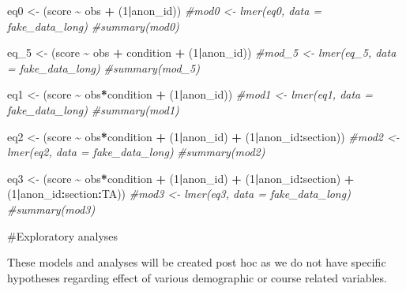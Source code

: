 \documentclass[
]{article}
\newenvironment{Shaded}{\begin{snugshade}}{\end{snugshade}}
\newcommand{\CommentTok}[1]{\textcolor[rgb]{0.56,0.35,0.01}{\textit{#1}}}
\newcommand{\DecValTok}[1]{\textcolor[rgb]{0.00,0.00,0.81}{#1}}
\newcommand{\NormalTok}[1]{#1}
\newcommand{\OtherTok}[1]{\textcolor[rgb]{0.56,0.35,0.01}{#1}}
\newcommand{\SpecialCharTok}[1]{\textcolor[rgb]{0.81,0.36,0.00}{\textbf{#1}}}
\begin{document}
\begin{Shaded}
\begin{Highlighting}[]
\NormalTok{eq0 }\OtherTok{\textless{}{-}}\NormalTok{ (score }\SpecialCharTok{\textasciitilde{}}\NormalTok{ obs }\SpecialCharTok{+}\NormalTok{ (}\DecValTok{1}\SpecialCharTok{|}\NormalTok{anon\_id))}
\CommentTok{\#mod0 \textless{}{-} lmer(eq0, data = fake\_data\_long)}
\CommentTok{\#summary(mod0)}



\NormalTok{eq\_5 }\OtherTok{\textless{}{-}}\NormalTok{ (score }\SpecialCharTok{\textasciitilde{}}\NormalTok{ obs }\SpecialCharTok{+}\NormalTok{ condition }\SpecialCharTok{+}\NormalTok{ (}\DecValTok{1}\SpecialCharTok{|}\NormalTok{anon\_id))}
\CommentTok{\#mod\_5 \textless{}{-} lmer(eq\_5, data = fake\_data\_long)}
\CommentTok{\#summary(mod\_5)}


\NormalTok{eq1 }\OtherTok{\textless{}{-}}\NormalTok{ (score }\SpecialCharTok{\textasciitilde{}}\NormalTok{ obs}\SpecialCharTok{*}\NormalTok{condition }\SpecialCharTok{+}\NormalTok{ (}\DecValTok{1}\SpecialCharTok{|}\NormalTok{anon\_id))}
\CommentTok{\#mod1 \textless{}{-} lmer(eq1, data = fake\_data\_long)}
\CommentTok{\#summary(mod1)}


\NormalTok{eq2 }\OtherTok{\textless{}{-}}\NormalTok{ (score }\SpecialCharTok{\textasciitilde{}}\NormalTok{ obs}\SpecialCharTok{*}\NormalTok{condition }\SpecialCharTok{+}\NormalTok{ (}\DecValTok{1}\SpecialCharTok{|}\NormalTok{anon\_id) }\SpecialCharTok{+}\NormalTok{ (}\DecValTok{1}\SpecialCharTok{|}\NormalTok{anon\_id}\SpecialCharTok{:}\NormalTok{section))}
\CommentTok{\#mod2 \textless{}{-} lmer(eq2, data = fake\_data\_long)}
\CommentTok{\#summary(mod2)}

\NormalTok{eq3 }\OtherTok{\textless{}{-}}\NormalTok{ (score }\SpecialCharTok{\textasciitilde{}}\NormalTok{ obs}\SpecialCharTok{*}\NormalTok{condition }\SpecialCharTok{+}\NormalTok{ (}\DecValTok{1}\SpecialCharTok{|}\NormalTok{anon\_id) }\SpecialCharTok{+}\NormalTok{ (}\DecValTok{1}\SpecialCharTok{|}\NormalTok{anon\_id}\SpecialCharTok{:}\NormalTok{section) }\SpecialCharTok{+}\NormalTok{ (}\DecValTok{1}\SpecialCharTok{|}\NormalTok{anon\_id}\SpecialCharTok{:}\NormalTok{section}\SpecialCharTok{:}\NormalTok{TA))}
\CommentTok{\#mod3 \textless{}{-} lmer(eq3, data = fake\_data\_long)}
\CommentTok{\#summary(mod3)}
\end{Highlighting}
\end{Shaded}

\#Exploratory analyses

These models and analyses will be created post hoc as we do not have
specific hypotheses regarding effect of various demographic or course
related variables.
\end{document}
